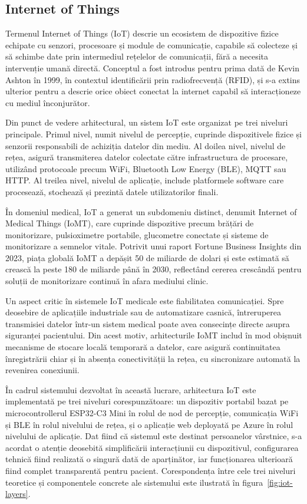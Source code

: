 \documentclass[12pt,a4paper]{article}
\begin{document}
\subsection{Internet of Things}

Termenul Internet of Things (IoT) descrie un ecosistem de dispozitive fizice echipate cu senzori, procesoare și module de comunicație, capabile să colecteze și să schimbe date prin intermediul rețelelor de comunicații, fără a necesita intervenție umană directă. Conceptul a fost introdus pentru prima dată de Kevin Ashton în 1999, în contextul identificării prin radiofrecvență (RFID), și s-a extins ulterior pentru a descrie orice obiect conectat la internet capabil să interacționeze cu mediul înconjurător.

Din punct de vedere arhitectural, un sistem IoT este organizat pe trei niveluri principale. Primul nivel, numit nivelul de percepție, cuprinde dispozitivele fizice și senzorii responsabili de achiziția datelor din mediu. Al doilea nivel, nivelul de rețea, asigură transmiterea datelor colectate către infrastructura de procesare, utilizând protocoale precum WiFi, Bluetooth Low Energy (BLE), MQTT sau HTTP. Al treilea nivel, nivelul de aplicație, include platformele software care procesează, stochează și prezintă datele utilizatorilor finali.

În domeniul medical, IoT a generat un subdomeniu distinct, denumit Internet of Medical Things (IoMT), care cuprinde dispozitive precum brățări de monitorizare, pulsioximetre portabile, glucometre conectate și sisteme de monitorizare a semnelor vitale. Potrivit unui raport Fortune Business Insights din 2023, piața globală IoMT a depășit 50 de miliarde de dolari și este estimată să crească la peste 180 de miliarde până în 2030, reflectând cererea crescândă pentru soluții de monitorizare continuă în afara mediului clinic.

Un aspect critic în sistemele IoT medicale este fiabilitatea comunicației. Spre deosebire de aplicațiile industriale sau de automatizare casnică, întreruperea transmisiei datelor într-un sistem medical poate avea consecințe directe asupra siguranței pacientului. Din acest motiv, arhitecturile IoMT includ în mod obișnuit mecanisme de stocare locală temporară a datelor, care asigură continuitatea înregistrării chiar și în absența conectivității la rețea, cu sincronizare automată la revenirea conexiunii.

În cadrul sistemului dezvoltat în această lucrare, arhitectura IoT este implementată pe trei niveluri corespunzătoare: un dispozitiv portabil bazat pe microcontrollerul ESP32-C3 Mini în rolul de nod de percepție, comunicația WiFi și BLE în rolul nivelului de rețea, și o aplicație web deployată pe Azure în rolul nivelului de aplicație. Dat fiind că sistemul este destinat persoanelor vârstnice, s-a acordat o atenție deosebită simplificării interacțiunii cu dispozitivul, configurarea tehnică fiind realizată o singură dată de aparținător, iar funcționarea ulterioară fiind complet transparentă pentru pacient. Corespondența între cele trei niveluri teoretice și componentele concrete ale sistemului este ilustrată în figura~\ref{fig:iot-layers}.
\end{document}
